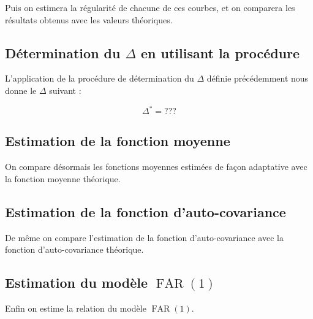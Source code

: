 \noindent  Puis on estimera la régularité de chacune de ces courbes, et on comparera les résultats obtenus avec les valeurs théoriques.


\subsection{Détermination du $\Delta$ en utilisant la procédure}

L'application de la procédure de détermination du $\Delta$ définie précédemment nous donne le $\Delta$ suivant :

\begin{equation*}
  \Delta^* = ???
\end{equation*}

\subsection{Estimation de la fonction moyenne}

On compare désormais les fonctions moyennes estimées de façon adaptative avec la fonction moyenne théorique.


\subsection{Estimation de la fonction d'auto-covariance}

De même on compare l'estimation de la fonction d'auto-covariance avec la fonction d'auto-covariance théorique.


\subsection{Estimation du modèle $\operatorname{FAR}(1)$}

Enfin on estime la relation du modèle $\operatorname{FAR}(1)$.




